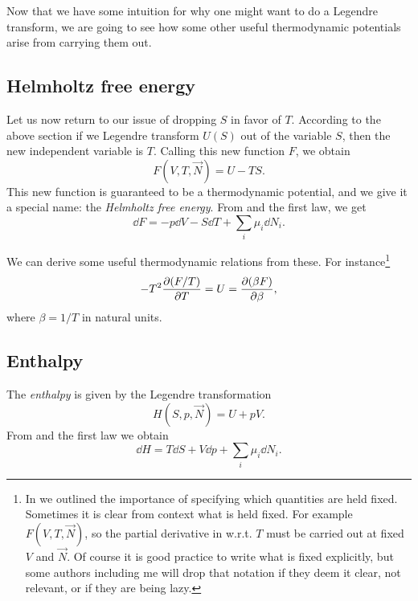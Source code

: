 Now that we have some intuition for why one might want to do a
Legendre transform, we are going to see how some other useful
thermodynamic potentials arise from carrying them out.

\subsection{Helmholtz free energy}
Let us now return to our issue of dropping $S$ in favor
of $T$. According to the above section if we
Legendre transform $U(S)$ out of the variable $S$, then 
the new independent variable is $T$. Calling
this new function $F$, we obtain
\begin{equation}\label{eq:helmholtz}
  F(V,T,\vec{N})=U-TS.
\end{equation}
This new function is guaranteed to be a thermodynamic potential, and
we give it a special name: the {\it Helmholtz free energy}.
From  and the first law, we get
\begin{equation}\label{eq:helmholtz1st}
  \dd F = -p\dd{V} -S\dd{T} +\sum_i\mu_i\dd{N}_i.
\end{equation}

We can derive some useful thermodynamic relations from these. For
instance\footnote{In  we outlined the importance of
specifying which quantities are held fixed. Sometimes it is clear from context
what is held fixed. For example $F(V,T,\vec{N})$, so the partial derivative in
 w.r.t. $T$ must be carried out at fixed $V$ and $\vec{N}$.
Of course it is good practice to write what is fixed explicitly, but some
authors including me will drop that notation if they deem it clear, not
relevant, or if they are being lazy.}
\begin{equation}\label{eq:dfdt}
  -T^2\pdv{(F/T)}{T}=U=\pdv{(\beta F)}{\beta},
\end{equation}
where $\beta=1/T$ in natural units.


\subsection{Enthalpy}

The {\it enthalpy} is given by the Legendre transformation
\begin{equation}\label{eq:enthalpy}
 H(S,p,\vec{N})=U+pV.
\end{equation}
From  and the first law we obtain
\begin{equation}
 \dd H = T\dd{S} +V\dd{p} +\sum_i\mu_i\dd N_i.
\end{equation}


